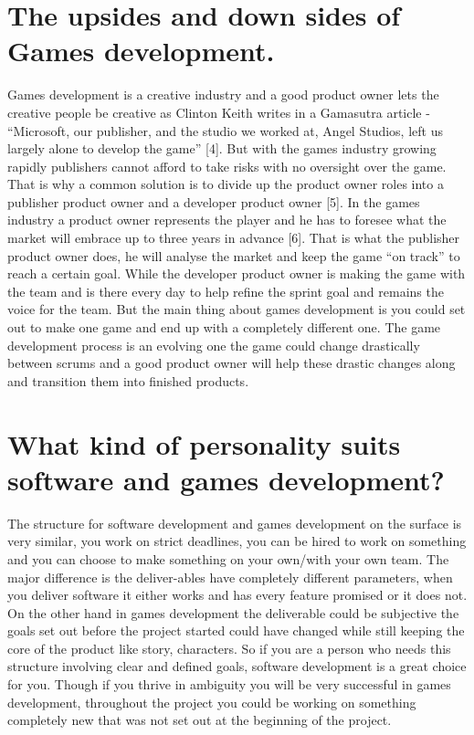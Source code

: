 \documentclass{scrartcl}
\begin{document}
\section{The upsides and down sides of Games development.}

Games development is a creative industry and a good product owner lets the creative people be creative as Clinton Keith writes in a Gamasutra article - “Microsoft, our publisher, and the studio we worked at, Angel Studios, left us largely alone to develop the game” [4]. But with the games industry growing rapidly publishers cannot afford to take risks with no oversight over the game. That is why a common solution is to divide up the product owner roles into a publisher product owner and a developer product owner [5]. In the games industry a product owner represents the player and he has to foresee what the market will embrace up to three years in advance [6]. That is what the publisher product owner does, he will analyse the market and keep the game “on track” to reach a certain goal. While the developer product owner is making the game with the team and is there every day to help refine the sprint goal and remains the voice for the team.
But the main thing about games development is you could set out to make one game and end up with a completely different one. The game development process is an evolving one the game could change drastically between scrums and a good product owner will help these drastic changes along and transition them into finished products. 

\section{What kind of personality suits software and games development?}

The structure for software development and games development on the surface is very similar, you work on strict deadlines, you can be hired to work on something and you can choose to make something on your own/with your own team. The major difference is the deliver-ables have completely different parameters, when you deliver software it either works and has every feature promised or it does not. On the other hand in games development the deliverable could be subjective the goals set out before the project started could have changed while still keeping the core of the product like story, characters. So if you are a person who needs this structure involving clear and defined goals, software development is a great choice for you. Though if you thrive in ambiguity you will be very successful in games development, throughout the project you could be working on something completely new that was not set out at the beginning of the project.
\end{document}
